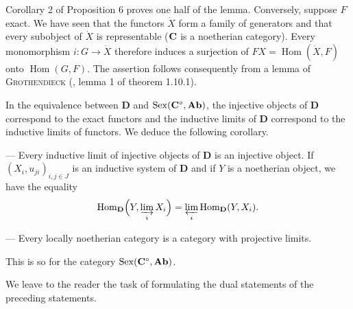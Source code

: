 Corollary 2 of Proposition 6 proves one half of the lemma. Conversely,
suppose $F$ exact. We have seen that the functors $\dot{X}$ form a family of
generators and that every subobject of $\dot{X}$ is representable ($\mathbf{C}$ is
a noetherian category). Every monomorphism $i\colon G\to \dot{X}$ therefore
induces a surjection of $FX = \operatorname{Hom}(\dot{X},F)$ onto
$\operatorname{Hom}(G,F)$. The assertion follows consequently from a lemma
of \textsc{Grothendieck} (\cite{grothendieck-1}, lemma 1 of theorem 1.10.1).

In the equivalence between $\mathbf{D}$ and
$\operatorname{Sex}(\mathbf{C}^{\circ},\mathbf{Ab})$, the injective objects of
$\mathbf{D}$ correspond to the exact functors and the inductive limits of
$\mathbf{D}$ correspond to the inductive limits of functors. We deduce the
following corollary.

\begin{corollary}
--- Every inductive limit of injective objects of $\mathbf{D}$ is an injective
object. If $(X_i,u_{ji})_{i,j\in J}$ is an inductive system of $\mathbf{D}$
and if $Y$ is a noetherian object, we have the equality
\[
  \operatorname{Hom}_{\mathbf{D}}\Bigl(Y,
    \varinjlim_i X_i\Bigr)
  = \varprojlim_i
    \operatorname{Hom}_{\mathbf{D}}(Y,X_i).
\]
\end{corollary}

\begin{corollary}
--- Every locally noetherian category is a category with projective limits.
\end{corollary}

This is so for the category $\operatorname{Sex}(\mathbf{C}^{\circ},\mathbf{Ab})$.

We leave to the reader the task of formulating the dual statements of the
preceding statements.